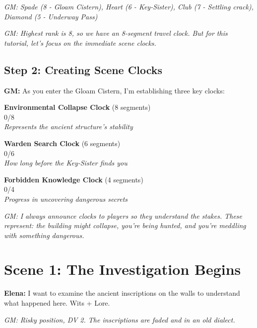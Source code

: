 \documentclass[11pt]{article}
\newcommand{\player}[1]{\textbf{#1:}}
\newcommand{\gm}[1]{\textit{GM: #1}}
\newcommand{\clocksegment}{\textbullet}
\begin{document}
\gm{Spade (8 - Gloam Cistern), Heart (6 - Key-Sister), Club (7 - Settling crack), Diamond (5 - Underway Pass)}

\gm{Highest rank is 8, so we have an 8-segment travel clock. But for this tutorial, let's focus on the immediate scene clocks.}

\subsection*{Step 2: Creating Scene Clocks}

\player{GM} As you enter the Gloam Cistern, I'm establishing three key clocks:

\begin{center}
\textbf{Environmental Collapse Clock} (8 segments)\\
\fbox{\clocksegment\clocksegment\clocksegment\clocksegment\clocksegment\clocksegment\clocksegment\clocksegment} 0/8\\
\textit{Represents the ancient structure's stability}
\end{center}

\begin{center}
\textbf{Warden Search Clock} (6 segments)\\
\fbox{\clocksegment\clocksegment\clocksegment\clocksegment\clocksegment\clocksegment} 0/6\\
\textit{How long before the Key-Sister finds you}
\end{center}

\begin{center}
\textbf{Forbidden Knowledge Clock} (4 segments)\\
\fbox{\clocksegment\clocksegment\clocksegment\clocksegment} 0/4\\
\textit{Progress in uncovering dangerous secrets}
\end{center}

\gm{I always announce clocks to players so they understand the stakes. These represent: the building might collapse, you're being hunted, and you're meddling with something dangerous.}

\section*{Scene 1: The Investigation Begins}

\player{Elena} I want to examine the ancient inscriptions on the walls to understand what happened here. Wits + Lore.

\gm{Risky position, DV 2. The inscriptions are faded and in an old dialect.}
\end{document}
